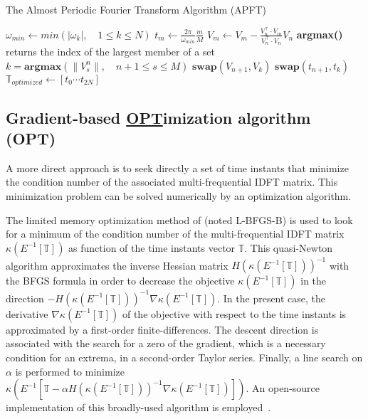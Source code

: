 \begin{algorithm}
\caption{The Almost Periodic Fourier Transform Algorithm (APFT)}
\label{alg:algo_APFT}
\begin{algorithmic}
\STATE $\omega_{min} \leftarrow min \left( |\omega_k |,\quad 1 \leqslant k \leqslant N \right)$
    \STATE $t_m \leftarrow \displaystyle\frac{2\pi}{\omega_{min}}\frac{m}{M}$
\ENDFOR
{}
  \STATE $ V_{m} \leftarrow V_{m} - \displaystyle\frac{V_{n}^\top \cdot V_{m}}{V_{n}^\top \cdot V_{n}} V_{n}$
   \ENDFOR
   \STATE \textbf{argmax()} returns the index of the largest member of a set
   \STATE $k=\textbf{argmax} \left( \| V_s^n \|,\quad n+1\leqslant s \leqslant M\right) $
   \STATE $\textbf{swap}(V_{n+1},V_{k})$
   \STATE $\textbf{swap}(t_{n+1},t_{k})$
\ENDFOR
\STATE $\mathbb{T}_{optimized} \leftarrow [t_0 \cdots t_{2N}]$
\end{algorithmic}
\end{algorithm}

\subsection{Gradient-based \texorpdfstring{\underline{OPT}}{OPT}imization algorithm (OPT)}
\label{sec:algo_opt}
A more direct approach is to seek directly a set of time instants
that minimize the condition number of the associated multi-frequential IDFT matrix. 
This minimization problem can be solved numerically by an optimization algorithm.

The limited memory optimization method of
\citet{Byrd1995} (noted L-BFGS-B) is
used to look for a minimum of the condition number of the
multi-frequential IDFT matrix $\kappa \left(E^{-1} \left[\mathbb{T} \right]
\right)$ as function of the time instants vector $\mathbb{T}$. This
quasi-Newton algorithm approximates the inverse Hessian matrix
$H(\kappa \left(E^{-1} \left[\mathbb{T} \right] \right))^{-1}$ with the
BFGS formula in order to decrease the objective $\kappa \left(E^{-1}
  \left[\mathbb{T} \right] \right)$ in the direction $-H(\kappa
\left(E^{-1} \left[\mathbb{T} \right] \right))^{-1}\nabla \kappa \left(E^{-1}
  \left[\mathbb{T} \right] \right)$. In the present case, the
derivative $\nabla \kappa \left(E^{-1} \left[\mathbb{T} \right] \right)$ of
the objective with respect to the time instants is approximated by
a first-order finite-differences. The descent direction is
associated with the search for a zero of the gradient, which is a
necessary condition for an extrema, in a second-order Taylor series.
Finally, a line search on $\alpha$ is performed to minimize $\kappa
\left(E^{-1} \left[\mathbb{T} - \alpha H(\kappa \left(E^{-1} \left[\mathbb{T}
      \right] \right))^{-1} \nabla \kappa \left(E^{-1} \left[\mathbb{T}
      \right] \right) \right] \right)$.  An open-source implementation of this
broadly-used algorithm is
employed~\cite{Nocedal1980}.

